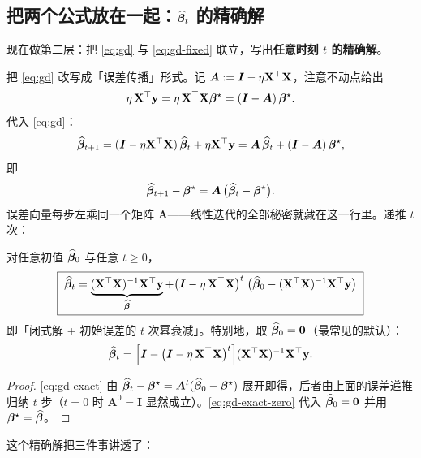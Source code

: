 \subsection[把两个公式放在一起：迭代解的精确解]{把两个公式放在一起：$\widehat{\bm{\beta}}_t$ 的精确解}\label{sec:gd-exact}

现在做第二层：把 \eqref{eq:gd} 与 \eqref{eq:gd-fixed} 联立，写出\textbf{任意时刻 $t$ 的精确解}。

把 \eqref{eq:gd} 改写成「误差传播」形式。记 $\bm{A} := \bm{I} - \eta \mathbf{X}^\top \mathbf{X}$，注意不动点给出
\[
  \eta\, \mathbf{X}^\top \mathbf{y} = \eta\, \mathbf{X}^\top \mathbf{X} \bm{\beta}^\star = (\bm{I} - \bm{A})\, \bm{\beta}^\star .
\]
代入 \eqref{eq:gd}：
\[
  \widehat{\bm{\beta}}_{t+1} = (\bm{I} - \eta \mathbf{X}^\top\mathbf{X})\, \widehat{\bm{\beta}}_t + \eta \mathbf{X}^\top \mathbf{y}
  = \bm{A}\, \widehat{\bm{\beta}}_t + (\bm{I} - \bm{A})\, \bm{\beta}^\star,
\]
即
\[
  \widehat{\bm{\beta}}_{t+1} - \bm{\beta}^\star = \bm{A}\, \big( \widehat{\bm{\beta}}_t - \bm{\beta}^\star \big).
\]
误差向量每步左乘同一个矩阵 $\bm{A}$——线性迭代的全部秘密就藏在这一行里。递推 $t$ 次：

\begin{theorem}\label{thm:gd-exact}
对任意初值 $\widehat{\bm{\beta}}_0$ 与任意 $t \ge 0$，
\begin{equation}\label{eq:gd-exact}
  \boxed{\;\widehat{\bm{\beta}}_t = \underbrace{(\mathbf{X}^\top \mathbf{X})^{-1} \mathbf{X}^\top \mathbf{y}}_{\widehat{\bm{\beta}}}
  + \big( \bm{I} - \eta\, \mathbf{X}^\top \mathbf{X} \big)^{t}\; \big( \widehat{\bm{\beta}}_0 - (\mathbf{X}^\top \mathbf{X})^{-1} \mathbf{X}^\top \mathbf{y} \big)\;}
\end{equation}
即「闭式解 + 初始误差的 $t$ 次幂衰减」。特别地，取 $\widehat{\bm{\beta}}_0 = \mathbf{0}$（最常见的默认）：
\begin{equation}\label{eq:gd-exact-zero}
  \widehat{\bm{\beta}}_t = \Big[ \bm{I} - \big( \bm{I} - \eta\, \mathbf{X}^\top \mathbf{X} \big)^{t} \Big] (\mathbf{X}^\top \mathbf{X})^{-1} \mathbf{X}^\top \mathbf{y} .
\end{equation}
\end{theorem}
\begin{proof}
\eqref{eq:gd-exact} 由 $\widehat{\bm{\beta}}_t - \bm{\beta}^\star = \bm{A}^t (\widehat{\bm{\beta}}_0 - \bm{\beta}^\star)$ 展开即得，后者由上面的误差递推归纳 $t$ 步（$t=0$ 时 $\bm{A}^0 = \bm{I}$ 显然成立）。\eqref{eq:gd-exact-zero} 代入 $\widehat{\bm{\beta}}_0 = \mathbf{0}$ 并用 $\bm{\beta}^\star = \widehat{\bm{\beta}}$。
\end{proof}

这个精确解把三件事讲透了：

